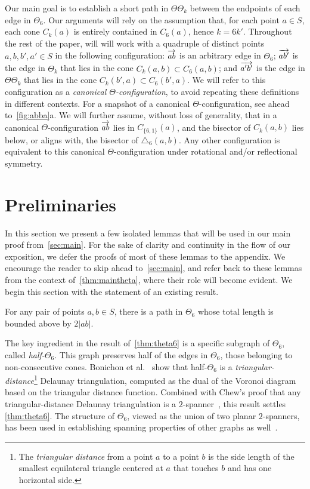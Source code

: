 \documentclass[runningheads,a4paper]{llncs}
\newcommand{\arr}[1]{\ensuremath{\protect\overrightarrow{#1}}}
\begin{document}
Our main goal is to establish a short path in $\Theta\Theta_k$ between the endpoints of each edge in $\Theta_6$. Our arguments will rely on the assumption that, for each point $a \in S$, each cone $C_k(a)$ is entirely contained in $C_6(a)$, hence $k = 6k'$. 
Throughout the rest of the paper, will will work with a quadruple of distinct points $a, b, b', a' \in S$ in the following configuration: $\arr{ab}$ is an arbitrary edge in $\Theta_6$; $\arr{ab'}$ is the edge in $\Theta_k$ that lies in the cone $C_k(a, b) \subset C_6(a,b)$; and $\arr{a'b'}$ is the edge in $\Theta\Theta_k$ that lies in the cone $C_k(b',a) \subset C_6(b',a)$. We will refer to this configuration as a \emph{canonical $\Theta$-configuration}, to avoid repeating these definitions in different contexts.
For a snapshot of a canonical $\Theta$-configuration, see ahead to~\autoref{fig:abba}a. 
We will further assume, without loss of generality, that in a canonical $\Theta$-configuration $\arr{ab}$ lies in $C_{\{6,1\}}(a)$, and the bisector of $C_k(a, b)$ lies below, or aligns with, the bisector of $\triangle_6(a,b)$. Any other configuration is equivalent to this canonical $\Theta$-configuration under rotational and/or reflectional symmetry.  

\section{Preliminaries}
\label{sec:basic}
In this section we present a few isolated lemmas that will be used in our main proof from~\autoref{sec:main}. 
For the sake of clarity and continuity in the flow of our exposition, we defer the proofs of most of these lemmas to the appendix. 
We encourage the reader to skip ahead to~\autoref{sec:main}, and refer back to these lemmas from the context of~\autoref{thm:maintheta}, where their role will become evident.
We begin this section with the statement of an existing result. 

\begin{theorem}{\emph{\cite{BGH+10}}}
For any pair of points $a, b\in S$, there is a path in $\Theta_6$ whose total length is bounded above by $2|ab|$.
\label{thm:theta6}
\end{theorem}
The key ingredient in the result of~\autoref{thm:theta6} is a specific subgraph of $\Theta_6$, called \emph{half-}$\Theta_6$. This graph preserves half of the edges in $\Theta_6$, those belonging to non-consecutive cones. Bonichon et al.~\cite{BGH+10} show that half-$\Theta_6$ is a
\emph{triangular-distance}\footnote{The \emph{triangular distance} from a point $a$ to a point $b$
is the side length of the smallest equilateral triangle centered at $a$ that touches $b$ and has one horizontal side.} 
Delaunay triangulation, computed as the dual of the Voronoi diagram based on
the triangular distance function. Combined with Chew's proof that any triangular-distance Delaunay triangulation is a $2$-spanner~\cite{Chew89}, this result settles \autoref{thm:theta6}. 
The structure of $\Theta_6$, viewed as the union of two planar $2$-spanners,  has been used in establishing spanning properties of other graphs as well~\cite{Bon2+10,jDR12,DB13}.
\end{document}
